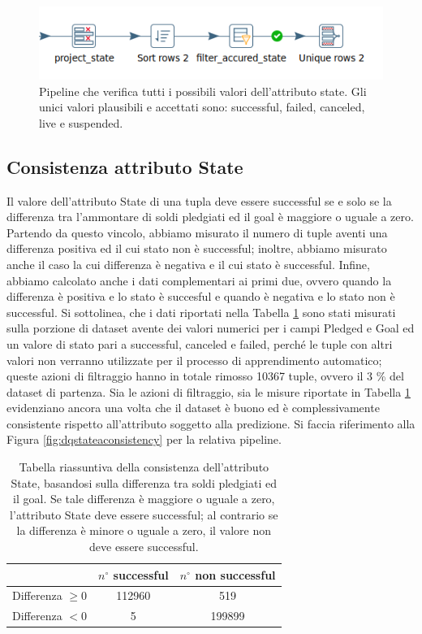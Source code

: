 \begin{figure}[h!]
	\centering
	\includegraphics[width=0.7\linewidth]{images/DQ_stateaccuracy}
	\caption{Pipeline che verifica tutti i possibili valori dell'attributo state. Gli unici valori plausibili e accettati sono: successful, failed, canceled, live e suspended.}
	\label{fig:dqstateaccuracy}
\end{figure}


\subsection{Consistenza attributo State}
Il valore dell'attributo State di una tupla deve essere successful se e solo se la differenza tra l'ammontare di soldi pledgiati ed il goal è maggiore o uguale a zero.
Partendo da questo vincolo, abbiamo misurato il numero di tuple aventi una differenza positiva ed il cui stato non è successful; inoltre, abbiamo misurato anche il caso la cui differenza è negativa e il cui stato è successful.
Infine, abbiamo calcolato anche i dati complementari ai primi due, ovvero quando la differenza è positiva e lo stato è succesful e quando è negativa e lo stato non è successful.
Si sottolinea, che i dati riportati nella Tabella \ref{tab:cons_state} sono stati misurati sulla porzione di dataset avente dei valori numerici per i campi Pledged e Goal ed un valore di stato pari a successful, canceled e failed, perché le tuple con altri valori non verranno utilizzate per il processo di apprendimento automatico; queste azioni di filtraggio hanno in totale rimosso 10367 tuple, ovvero il 3 \% del dataset di partenza. 
Sia le azioni di filtraggio, sia le misure riportate in Tabella \ref{tab:cons_state} evidenziano ancora una volta che il dataset è buono ed è complessivamente consistente rispetto all'attributo soggetto alla predizione.
Si faccia riferimento alla Figura \ref{fig:dqstateaconsistency} per la relativa pipeline.
\begin{table}
	\caption{Tabella riassuntiva della consistenza dell'attributo State, basandosi sulla differenza tra soldi pledgiati ed il goal. Se tale differenza è maggiore o uguale a zero, l'attributo State deve essere successful; al contrario se la differenza è minore o uguale a zero, il valore non deve essere successful.}
	
	\label{tab:cons_state}
	
	\centering
	\begin{tabular}{c|cc}
		& $n^{\circ}$ successful & $n^{\circ}$ non successful \\
		\hline
		\rule{0pt}{13pt}Differenza $\geq 0$  & 112960 & 519 \\ 
		\rule{0pt}{13pt}Differenza $< 0$& 5 & 199899 \\
	\end{tabular}
\end{table} 
